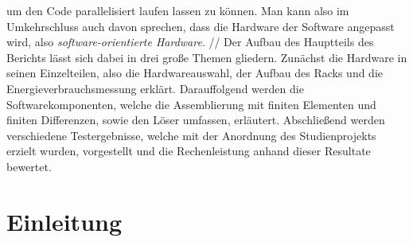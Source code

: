  um den Code parallelisiert laufen lassen zu können. Man kann also im Umkehrschluss auch davon sprechen,
 dass die Hardware der Software angepasst wird, also \textit{software-orientierte Hardware}. 
//
Der Aufbau des Hauptteils des Berichts lässt sich dabei in drei große Themen gliedern.
 Zunächst die Hardware in seinen Einzelteilen, also die Hardwareauswahl,
 der Aufbau des Racks und die Energieverbrauchsmessung erklärt.
 Darauffolgend werden die Softwarekomponenten, welche die Assemblierung mit finiten Elementen und finiten Differenzen,
 sowie den Löser umfassen, erläutert. Abschließend werden verschiedene Testergebnisse,
 welche mit der Anordnung des Studienprojekts erzielt wurden, vorgestellt und die Rechenleistung anhand dieser Resultate bewertet. 



\section{Einleitung}


